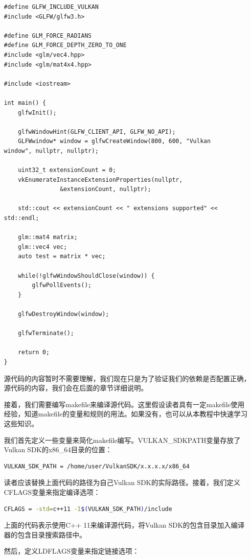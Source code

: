 \documentclass{ctexart}
\begin{document}
\begin{lstlisting}[language={[ANSI]C}]
#define GLFW_INCLUDE_VULKAN
#include <GLFW/glfw3.h>

#define GLM_FORCE_RADIANS
#define GLM_FORCE_DEPTH_ZERO_TO_ONE
#include <glm/vec4.hpp>
#include <glm/mat4x4.hpp>

#include <iostream>

int main() {
	glfwInit();

	glfwWindowHint(GLFW_CLIENT_API, GLFW_NO_API);
	GLFWwindow* window = glfwCreateWindow(800, 600, "Vulkan
window", nullptr, nullptr);

	uint32_t extensionCount = 0;
	vkEnumerateInstanceExtensionProperties(nullptr,
				&extensionCount, nullptr);

	std::cout << extensionCount << " extensions supported" << std::endl;

	glm::mat4 matrix;
	glm::vec4 vec;
	auto test = matrix * vec;

	while(!glfwWindowShouldClose(window)) {
		glfwPollEvents();
	}

	glfwDestroyWindow(window);

	glfwTerminate();

	return 0;
}
\end{lstlisting}

源代码的内容暂时不需要理解，我们现在只是为了验证我们的依赖是否配置正确，源代码的内容，我们会在后面的章节详细说明。

接着，我们需要编写makefile来编译源代码。这里假设读者具有一定makefile使用经验，知道makefile的变量和规则的用法。如果没有，也可以从本教程中快速学习这些知识。

我们首先定义一些变量来简化makefile编写。VULKAN\_SDKPATH变量存放了Vulkan SDK的x86\_64目录的位置：

\begin{lstlisting}[language={bash}]
VULKAN_SDK_PATH = /home/user/VulkanSDK/x.x.x.x/x86_64
\end{lstlisting}

读者应该替换上面代码的路径为自己Vulkan SDK的实际路径。接着，我们定义CFLAGS变量来指定编译选项：

\begin{lstlisting}[language={bash}]
CFLAGS = -std=c++11 -I$(VULKAN_SDK_PATH)/include
\end{lstlisting}

上面的代码表示使用C++ 11来编译源代码，将Vulkan SDK的包含目录加入编译器的包含目录搜索路径中。

然后，定义LDFLAGS变量来指定链接选项：
\end{document}

